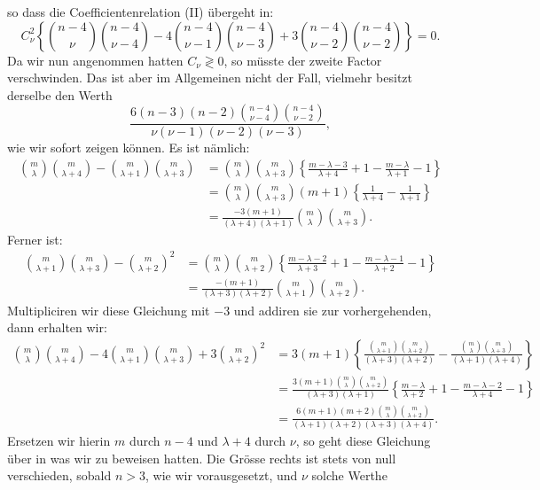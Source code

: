 so dass die Coefficientenrelation (II) \"ubergeht in:
\[
C_\nu^2\left\{\binom{n-4}{\nu}\binom{n-4}{\nu-4} - 4\binom{n-4}{\nu-1}\binom{n-4}{\nu-3} + 3\binom{n-4}{\nu-2}\binom{n-4}{\nu-2}\right\} = 0.
\]
Da wir nun angenommen hatten $C_\nu \gtrless 0$, so m\"usste der
zweite Factor verschwinden. Das ist aber im Allgemeinen nicht der
Fall, vielmehr besitzt derselbe den Werth
\[
\frac{6(n-3)(n-2)\binom{n-4}{\nu-4}\binom{n-4}{\nu-2}}{\nu(\nu-1)(\nu-2)(\nu-3)},
\]
wie wir sofort zeigen k\"onnen. Es ist n\"amlich:
\[
\begin{aligned}
\binom{m}{\lambda}\binom{m}{\lambda+4} - \binom{m}{\lambda+1}\binom{m}{\lambda+3} &= \binom{m}{\lambda}\binom{m}{\lambda+3}\left\{\frac{m-\lambda-3}{\lambda+4} + 1 - \frac{m-\lambda}{\lambda+1} - 1\right\}\\
&= \binom{m}{\lambda}\binom{m}{\lambda+3}(m+1)\left\{\frac{1}{\lambda+4} - \frac{1}{\lambda+1}\right\}\\
&= \frac{-3(m+1)}{(\lambda+4)(\lambda+1)}\binom{m}{\lambda}\binom{m}{\lambda+3}.
\end{aligned}
\]
Ferner ist:
\[
\begin{aligned}
\binom{m}{\lambda+1}\binom{m}{\lambda+3} - \binom{m}{\lambda+2}^2 &= \binom{m}{\lambda}\binom{m}{\lambda+2}\left\{\frac{m-\lambda-2}{\lambda+3} + 1 - \frac{m-\lambda-1}{\lambda+2} - 1\right\}\\
&= \frac{-(m+1)}{(\lambda+3)(\lambda+2)}\binom{m}{\lambda+1}\binom{m}{\lambda+2}.
\end{aligned}
\]
Multipliciren wir diese Gleichung mit $-3$ und addiren sie zur
vorhergehenden, dann erhalten wir:
\[
\begin{aligned}
\binom{m}{\lambda}\binom{m}{\lambda+4} - 4\binom{m}{\lambda+1}\binom{m}{\lambda+3} + 3\binom{m}{\lambda+2}^2 &= 3(m+1)\left\{\frac{\binom{m}{\lambda+1}\binom{m}{\lambda+2}}{(\lambda+3)(\lambda+2)} - \frac{\binom{m}{\lambda}\binom{m}{\lambda+3}}{(\lambda+1)(\lambda+4)}\right\}\\
&= \frac{3(m+1)\binom{m}{\lambda}\binom{m}{\lambda+2}}{(\lambda+3)(\lambda+1)}\left\{\frac{m-\lambda}{\lambda+2} + 1 - \frac{m-\lambda-2}{\lambda+4} - 1\right\}\\
&= \frac{6(m+1)(m+2)\binom{m}{\lambda}\binom{m}{\lambda+2}}{(\lambda+1)(\lambda+2)(\lambda+3)(\lambda+4)}.
\end{aligned}
\]
Ersetzen wir hierin $m$ durch $n-4$ und $\lambda+4$ durch $\nu$, so
geht diese Gleichung \"uber in
was wir zu beweisen hatten. Die Gr\"osse rechts ist stets von null
verschieden, sobald $n > 3$, wie wir vorausgesetzt, und $\nu$ solche
Werthe


